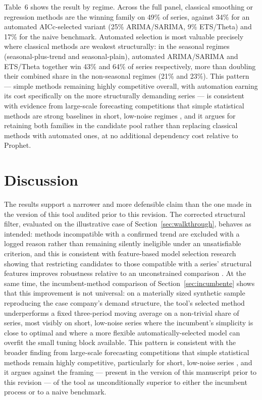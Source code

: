 \documentclass[forecasting,article,submit,pdftex,moreauthors]{Definitions/mdpi}
\begin{document}
Table~6 shows the result by regime. Across the full panel, classical smoothing or regression methods are the winning family on 49\% of series, against 34\% for an automated AICc-selected variant (25\% ARIMA/SARIMA, 9\% ETS/Theta) and 17\% for the naive benchmark. Automated selection is most valuable precisely where classical methods are weakest structurally: in the seasonal regimes (seasonal-plus-trend and seasonal-plain), automated ARIMA/SARIMA and ETS/Theta together win 43\% and 64\% of series respectively, more than doubling their combined share in the non-seasonal regimes (21\% and 23\%). This pattern --- simple methods remaining highly competitive overall, with automation earning its cost specifically on the more structurally demanding series --- is consistent with evidence from large-scale forecasting competitions that simple statistical methods are strong baselines in short, low-noise regimes \cite{makridakis2020}, and it argues for retaining both families in the candidate pool rather than replacing classical methods with automated ones, at no additional dependency cost relative to Prophet.

\section{Discussion}
\label{sec:discussion}

The results support a narrower and more defensible claim than the one made in the version of this tool audited prior to this revision. The corrected structural filter, evaluated on the illustrative case of Section~\ref{sec:walkthrough}, behaves as intended: methods incompatible with a confirmed trend are excluded with a logged reason rather than remaining silently ineligible under an unsatisfiable criterion, and this is consistent with feature-based model selection research showing that restricting candidates to those compatible with a series' structural features improves robustness relative to an unconstrained comparison \cite{monteromanso2020,talagala2021}. At the same time, the incumbent-method comparison of Section~\ref{sec:incumbente} shows that this improvement is not universal: on a materially sized synthetic sample reproducing the case company's demand structure, the tool's selected method underperforms a fixed three-period moving average on a non-trivial share of series, most visibly on short, low-noise series where the incumbent's simplicity is close to optimal and where a more flexible automatically-selected model can overfit the small tuning block available. This pattern is consistent with the broader finding from large-scale forecasting competitions that simple statistical methods remain highly competitive, particularly for short, low-noise series \cite{makridakis2020}, and it argues against the framing --- present in the version of this manuscript prior to this revision --- of the tool as unconditionally superior to either the incumbent process or to a naive benchmark.
\end{document}
